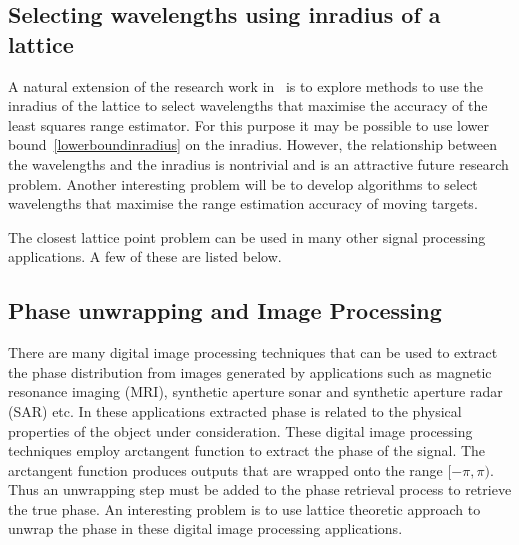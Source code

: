 \subsection*{Selecting wavelengths using inradius of a lattice}
A natural extension of the research work in~ is to explore methods to use the inradius of the lattice to select wavelengths that maximise the accuracy of the least squares range estimator. For this purpose it may be possible to use lower bound~\ref{lowerboundinradius} on the inradius. However, the relationship between the wavelengths and the inradius is nontrivial and is an attractive future research problem. Another interesting problem will be to develop algorithms to select wavelengths that maximise the range estimation accuracy of moving targets.

The closest lattice point problem can be used in many other signal processing applications. A few of these are listed below.
\subsection*{Phase unwrapping and Image Processing}
There are many digital image processing techniques that can be used to extract the phase distribution from images generated by applications such as magnetic resonance imaging (MRI), synthetic aperture sonar and synthetic aperture radar (SAR) etc. In these applications extracted phase is related to the physical properties of the object under consideration. These digital image processing techniques employ arctangent function to extract the phase of the signal. The arctangent function produces outputs that are wrapped onto the range $[-\pi, \pi)$. Thus an unwrapping step must be added to the phase retrieval process to retrieve the true phase. An interesting problem is to use lattice theoretic approach to unwrap the phase in these digital image processing applications.

